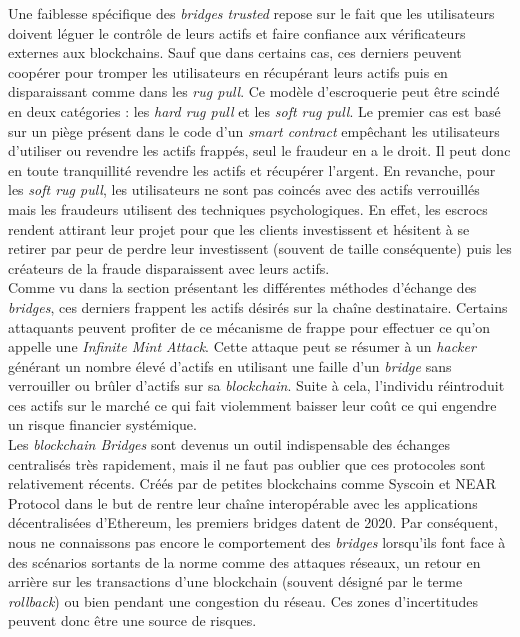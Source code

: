 Une faiblesse spécifique des \textit{bridges trusted} repose sur le fait que les utilisateurs doivent léguer le contrôle de leurs \gls{actif}s et faire confiance aux \gls{vérificateur}s externes aux \gls{blockchain}s. Sauf que dans certains cas, ces derniers peuvent coopérer pour tromper les utilisateurs en récupérant leurs \gls{actif}s puis en disparaissant comme dans les \textit{rug pull}\cite{EthereumRisks}. Ce modèle d’escroquerie peut être scindé en deux catégories : les \textit{hard rug pull} et les \textit{soft rug pull}\cite{Hacken}. Le premier cas est basé sur un piège présent dans le code d’un \textit{\gls{smart contract}} empêchant les utilisateurs d’utiliser ou revendre les \gls{actif}s frappés, seul le fraudeur en a le droit. Il peut donc en toute tranquillité revendre les \gls{actif}s et récupérer l’argent. En revanche, pour les \textit{soft rug pull}, les utilisateurs ne sont pas coincés avec des \gls{actif}s verrouillés mais les fraudeurs utilisent des techniques psychologiques. En effet, les escrocs rendent attirant leur projet pour que les clients investissent et hésitent à se retirer par peur de perdre leur investissent (souvent de taille conséquente) puis les créateurs de la fraude disparaissent avec leurs \gls{actif}s.\\

Comme vu dans la section présentant les différentes méthodes d’échange des \textit{bridges}, ces derniers frappent les \gls{actif}s désirés sur la chaîne destinataire. Certains attaquants peuvent profiter de ce mécanisme de frappe pour effectuer ce qu’on appelle une \textit{Infinite Mint Attack}.\cite{ChainLinkRisks} Cette attaque peut se résumer à un \textit{hacker} générant un nombre élevé d’\gls{actif}s en utilisant une faille d’un \textit{bridge} sans verrouiller ou brûler d’\gls{actif}s sur sa \textit{\gls{blockchain}}. Suite à cela, l’individu réintroduit ces \gls{actif}s sur le marché ce qui fait violemment baisser leur coût ce qui engendre un risque financier systémique.\\

Les \textit{\gls{blockchain} Bridges} sont devenus un outil indispensable des échanges centralisés très rapidement, mais il ne faut pas oublier que ces protocoles sont relativement récents. Créés par de petites \gls{blockchain}s comme Syscoin et NEAR Protocol dans le but de rentre leur chaîne interopérable avec les applications décentralisées d’\gls{Ethereum}, les premiers bridges datent de 2020\cite{Bitstamp}. Par conséquent, nous ne connaissons pas encore le comportement des \textit{bridges} lorsqu’ils font face à des scénarios sortants de la norme comme des attaques réseaux, un retour en arrière sur les transactions d’une \gls{blockchain} (souvent désigné par le terme \textit{rollback}) ou bien pendant une congestion du réseau. Ces zones d’incertitudes peuvent donc être une source de risques. \\

